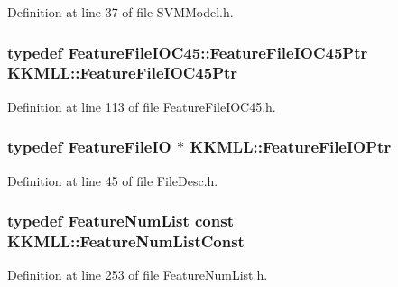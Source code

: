 Definition at line 37 of file S\+V\+M\+Model.\+h.

\subsubsection[{\texorpdfstring{Feature\+File\+I\+O\+C45\+Ptr}{FeatureFileIOC45Ptr}}]{\setlength{\rightskip}{0pt plus 5cm}typedef {\bf Feature\+File\+I\+O\+C45\+::\+Feature\+File\+I\+O\+C45\+Ptr} {\bf K\+K\+M\+L\+L\+::\+Feature\+File\+I\+O\+C45\+Ptr}}\hypertarget{namespace_k_k_m_l_l_ab57854d582cae8723e029d8066ef75b8}{}\label{namespace_k_k_m_l_l_ab57854d582cae8723e029d8066ef75b8}


Definition at line 113 of file Feature\+File\+I\+O\+C45.\+h.

\subsubsection[{\texorpdfstring{Feature\+File\+I\+O\+Ptr}{FeatureFileIOPtr}}]{\setlength{\rightskip}{0pt plus 5cm}typedef {\bf Feature\+File\+IO} $\ast$ {\bf K\+K\+M\+L\+L\+::\+Feature\+File\+I\+O\+Ptr}}\hypertarget{namespace_k_k_m_l_l_aa005d92db87866fad489feb5ff4b2dfa}{}\label{namespace_k_k_m_l_l_aa005d92db87866fad489feb5ff4b2dfa}


Definition at line 45 of file File\+Desc.\+h.

\subsubsection[{\texorpdfstring{Feature\+Num\+List\+Const}{FeatureNumListConst}}]{\setlength{\rightskip}{0pt plus 5cm}typedef {\bf Feature\+Num\+List} const {\bf K\+K\+M\+L\+L\+::\+Feature\+Num\+List\+Const}}\hypertarget{namespace_k_k_m_l_l_ad276a9ed309552a63300bce930bdfebd}{}\label{namespace_k_k_m_l_l_ad276a9ed309552a63300bce930bdfebd}


Definition at line 253 of file Feature\+Num\+List.\+h.

